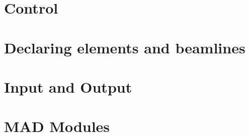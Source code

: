 \documentclass[11pt,a4paper,twoside]{book}
\begin{document}

\tableofcontents

\part{Control}



\part{Declaring elements and beamlines} %

\part{Input and Output}                 %




\part{MAD Modules}                      %
%
%
\end{document}
